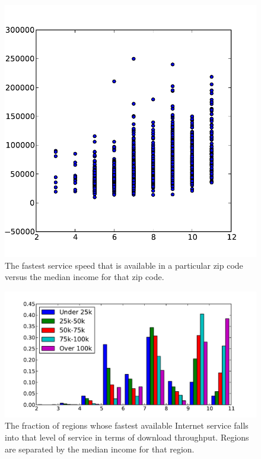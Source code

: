 \documentclass{sig-alternate-10pt}
\begin{document}


\begin{figure}
\centering
        \includegraphics[width=0.9\linewidth]{figs/maxIncome_maxDown.pdf}
  \caption{The fastest service speed that is available 
in a particular zip code versus the median income for that
zip code.}
  \label{fig:services-incomeVsDown}
\end{figure}

\begin{figure}
\centering
        \includegraphics[width=0.9\linewidth]{figs/all_hist.pdf}
  \caption{The fraction of regions whose fastest available Internet
service falls into that level of service in terms of download throughput.
Regions are separated by the median income for that region.}
  \label{fig:services-hist}
\end{figure}
\end{document}
